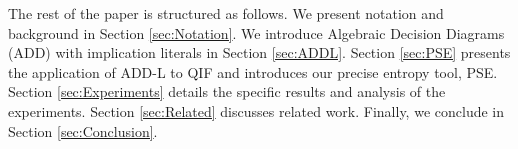 The rest of the paper is structured as follows. 
We present notation and background in Section \ref{sec:Notation}.
We introduce Algebraic Decision Diagrams (ADD) with implication literals in Section \ref{sec:ADDL}.
Section \ref{sec:PSE} presents the application of ADD-L to QIF and introduces our precise entropy tool, PSE. 
Section \ref{sec:Experiments} details the specific results and analysis of the experiments.
Section \ref{sec:Related} discusses related work.
Finally, we conclude in Section \ref{sec:Conclusion}.
